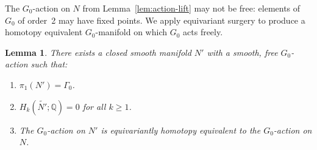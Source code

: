 \documentclass[12pt]{article}
\newtheorem{lemma}[theorem]{Lemma}
\theoremstyle{definition}
\theoremstyle{remark}
\begin{document}
The $G_0$-action on $N$ from Lemma~\ref{lem:action-lift} may not be free: elements
of $G_0$ of order~2 may have fixed points. We apply equivariant surgery to produce a
homotopy equivalent $G_0$-manifold on which $G_0$ acts freely.

\begin{lemma}
\label{lem:free-action}
There exists a closed smooth manifold $N'$ with a smooth, free $G_0$-action such that:
\begin{enumerate}
  \item[\textup{(i)}] $\pi_1(N') = \Gamma_0$.
  \item[\textup{(ii)}] $H_k(\widetilde{N'};\mathbb{Q}) = 0$ for all $k\geq 1$.
  \item[\textup{(iii)}] The $G_0$-action on $N'$ is equivariantly homotopy equivalent
        to the $G_0$-action on $N$.
\end{enumerate}
\end{lemma}
\end{document}
